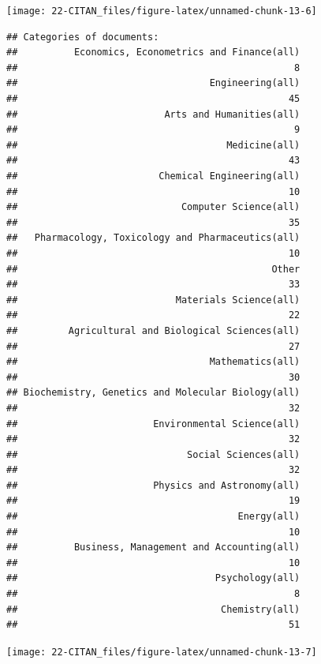 \documentclass[
]{book}
\begin{document}
\begin{center}\texttt{[image: 22-CITAN\_files/figure-latex/unnamed-chunk-13-6]} \end{center}

\begin{verbatim}
## Categories of documents:
##          Economics, Econometrics and Finance(all) 
##                                                 8 
##                                  Engineering(all) 
##                                                45 
##                          Arts and Humanities(all) 
##                                                 9 
##                                     Medicine(all) 
##                                                43 
##                         Chemical Engineering(all) 
##                                                10 
##                             Computer Science(all) 
##                                                35 
##   Pharmacology, Toxicology and Pharmaceutics(all) 
##                                                10 
##                                             Other 
##                                                33 
##                            Materials Science(all) 
##                                                22 
##         Agricultural and Biological Sciences(all) 
##                                                27 
##                                  Mathematics(all) 
##                                                30 
## Biochemistry, Genetics and Molecular Biology(all) 
##                                                32 
##                        Environmental Science(all) 
##                                                32 
##                              Social Sciences(all) 
##                                                32 
##                        Physics and Astronomy(all) 
##                                                19 
##                                       Energy(all) 
##                                                10 
##          Business, Management and Accounting(all) 
##                                                10 
##                                   Psychology(all) 
##                                                 8 
##                                    Chemistry(all) 
##                                                51
\end{verbatim}

\begin{center}\texttt{[image: 22-CITAN\_files/figure-latex/unnamed-chunk-13-7]} \end{center}
\end{document}
